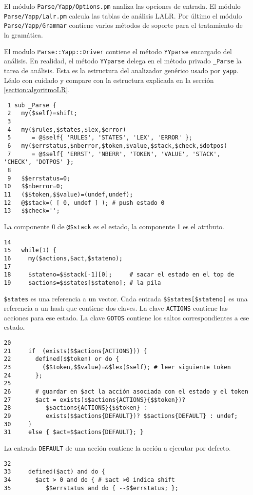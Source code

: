 El módulo \verb|Parse/Yapp/Options.pm|
analiza las opciones de entrada. El módulo \verb|Parse/Yapp/Lalr.pm|
calcula las tablas de análisis LALR. Por último el módulo
\verb|Parse/Yapp/Grammar| contiene varios métodos de soporte 
para el tratamiento de la gramática.


El modulo {\tt Parse::Yapp::Driver} contiene el método
\verb|YYparse| encargado del análisis.
En realidad, el método \verb|YYparse| delega 
en el método privado \verb|_Parse| la tarea de análisis.
Esta es la estructura del analizador genérico usado por \verb|yapp|.
Léalo con cuidado y compare con la estructura explicada en la
sección \ref{section:algoritmoLR}.

\begin{verbatim}
 1 sub _Parse {
 2   my($self)=shift;
 3 
 4   my($rules,$states,$lex,$error)
 5      = @$self{ 'RULES', 'STATES', 'LEX', 'ERROR' };
 6   my($errstatus,$nberror,$token,$value,$stack,$check,$dotpos)
 7      = @$self{ 'ERRST', 'NBERR', 'TOKEN', 'VALUE', 'STACK', 'CHECK', 'DOTPOS' };
 8 
 9   $$errstatus=0;
10   $$nberror=0;
11   ($$token,$$value)=(undef,undef);
12   @$stack=( [ 0, undef ] ); # push estado 0
13   $$check='';
\end{verbatim}
La componente 0 de \verb|@$stack| es el estado, la componente
1 es el atributo.
\begin{verbatim}
14 
15   while(1) { 
16     my($actions,$act,$stateno);
17 
18     $stateno=$$stack[-1][0];     # sacar el estado en el top de 
19     $actions=$$states[$stateno]; # la pila
\end{verbatim}
\verb|$states| es una referencia a un vector. Cada entrada 
\verb|$$states[$stateno]| es una referencia a un hash que 
contiene dos claves. La clave \verb|ACTIONS| contiene
las acciones para ese estado. La clave \verb|GOTOS|
contiene los saltos correspondientes a ese estado.
\begin{verbatim}
20 
21     if  (exists($$actions{ACTIONS})) {
22       defined($$token) or do {
23         ($$token,$$value)=&$lex($self); # leer siguiente token
24       };
25 
26       # guardar en $act la acción asociada con el estado y el token
27       $act = exists($$actions{ACTIONS}{$$token})?   
28          $$actions{ACTIONS}{$$token} : 
29          exists($$actions{DEFAULT})? $$actions{DEFAULT} : undef;
30     }
31     else { $act=$$actions{DEFAULT}; }
\end{verbatim}
La entrada \verb|DEFAULT| de una acción contiene la acción 
a ejecutar por defecto.
\begin{verbatim}
32 
33     defined($act) and do {
34       $act > 0 and do { # $act >0 indica shift
35          $$errstatus and do { --$$errstatus; };
\end{verbatim}
